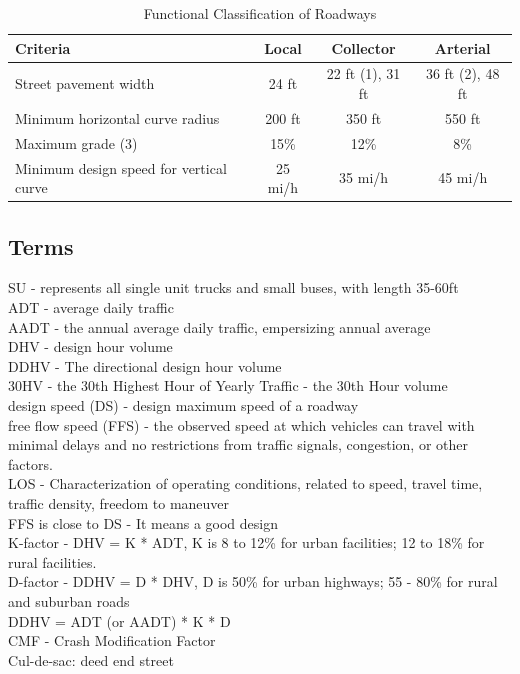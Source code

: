 \documentclass{article}
\begin{document}
\begin{table}[ht]
\centering
\caption{Functional Classification of Roadways}
\label{tab:functional_classification}
\begin{tabular}{@{}lccc@{}}
\hline
\textbf{Criteria} & \textbf{Local} & \textbf{Collector} & \textbf{Arterial} \\
\hline
Street pavement width & 24 ft & 22 ft (1), 31 ft & 36 ft (2), 48 ft \\
Minimum horizontal curve radius & 200 ft & 350 ft & 550 ft \\
Maximum grade (3) & 15\% & 12\% & 8\% \\
Minimum design speed for vertical curve & 25 mi/h & 35 mi/h & 45 mi/h \\
\hline
\end{tabular}
\end{table}


  \subsection{Terms}
  SU - represents all single unit trucks and small buses, with length 35-60ft \\
  ADT - average daily traffic \\
  AADT - the annual average daily traffic, empersizing annual average \\
  DHV - design hour volume \\
  DDHV - The directional design hour volume \\
  30HV - the 30th Highest Hour of Yearly Traffic - the 30th Hour volume \\
  design speed (DS) - design maximum speed of a roadway \\
  free flow speed (FFS) - the observed speed at which vehicles can travel with minimal delays and no restrictions from traffic signals, congestion, or other factors. \\
  LOS - Characterization of operating conditions, related to speed, travel time, traffic density, freedom to maneuver  \\
  FFS is close to DS - It means a good design \\
  K-factor - DHV = K * ADT, K is 8 to 12\% for urban facilities; 12 to 18\% for rural facilities.  \\
  D-factor - DDHV = D * DHV, D is 50\% for urban highways; 55 - 80\% for rural and suburban roads \\
  DDHV = ADT (or AADT) * K * D \\
  CMF - Crash Modification Factor \\
  Cul-de-sac: deed end street \\
\end{document}

